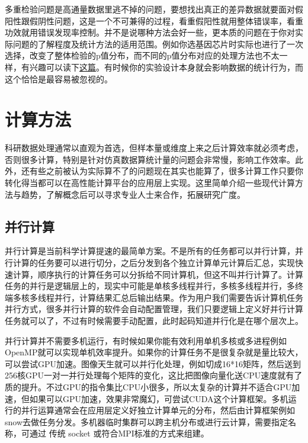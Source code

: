 \documentclass[]{tufte-book}
\begin{document}
多重检验问题是高通量数据里逃不掉的问题，要想找出真正的差异数据就要面对假阳性跟假阴性问题，这是一个不可兼得的过程，看重假阳性就用整体错误率，看重功效就用错误发现率控制。并不是说哪种方法会好一些，更本质的问题在于你对实际问题的了解程度及统计方法的适用范围。例如你选基因芯片时实际也进行了一次选择，改变了整体检验的p值分布，而不同的p值分布对应的处理方法也不太一样，有兴趣可以读下\href{http://varianceexplained.org/statistics/interpreting-pvalue-histogram/}{这篇}。有时候你的实验设计本身就会影响数据的统计行为，而这个恰恰是最容易被忽视的。

\hypertarget{ux8ba1ux7b97ux65b9ux6cd5}{%
\section{计算方法}\label{ux8ba1ux7b97ux65b9ux6cd5}}

科研数据处理通常以直观为首选，但样本量或维度上来之后计算效率就必须考虑，否则很多计算，特别是针对仿真数据算统计量的问题会非常慢，影响工作效率。此外，还有些之前被认为实际算不了的问题现在其实也能算了，很多计算工作只要你转化得当都可以在高性能计算平台的应用层上实现。这里简单介绍一些现代计算方法与趋势，了解概念后可以寻求专业人士来合作，拓展研究广度。

\hypertarget{ux5e76ux884cux8ba1ux7b97}{%
\subsection{并行计算}\label{ux5e76ux884cux8ba1ux7b97}}

并行计算是当前科学计算提速的最简单方案。不是所有的任务都可以并行计算，并行计算的任务要可以进行切分，之后分发到各个独立计算单元计算后汇总，实现快速计算，顺序执行的计算任务可以分拆给不同计算机，但这不叫并行计算了。计算任务的并行是逻辑层上的，现实中可能是单核多线程并行，多核多线程并行，多终端多核多线程并行，计算结果汇总后输出结果。作为用户我们需要告诉计算机任务并行方式，很多并行计算的软件会自动配置管理，我们只要逻辑上定义好并行计算任务就可以了，不过有时候需要手动配置，此时起码知道并行化是在哪个层次上。

并行计算并不需要多机运行，有时候如果你能有效利用单机多核或多进程例如OpenMP就可以实现单机效率提升。如果你的计算任务不是很复杂就是量比较大，可以尝试GPU加速。图像天生就可以并行化处理，例如切成16*16矩阵，然后送到256核GPU一对一并行处理每个矩阵的变化，这比把图像向量化送CPU速度就有了质的提升。不过GPU的指令集比CPU小很多，所以太复杂的计算并不适合GPU加速，但如果可以GPU加速，效果非常魔幻，可尝试CUDA这个计算框架。多机运行的并行运算通常会在应用层定义好独立计算单元的分布，然后由计算框架例如snow去做任务分发。多机器临时集群可以跨主机分布或进行云计算，需要指定名称，可通过 传统 socket 或符合MPI标准的方式来组建。
\end{document}

